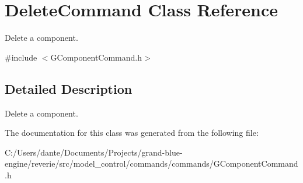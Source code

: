 \hypertarget{class_delete_command}{}\section{Delete\+Command Class Reference}
\label{class_delete_command}


Delete a component.  




{\ttfamily \#include $<$G\+Component\+Command.\+h$>$}



\subsection{Detailed Description}
Delete a component. 

The documentation for this class was generated from the following file\+:\begin{DoxyCompactItemize}
\item 
C\+:/\+Users/dante/\+Documents/\+Projects/grand-\/blue-\/engine/reverie/src/model\+\_\+control/commands/commands/G\+Component\+Command.\+h\end{DoxyCompactItemize}
